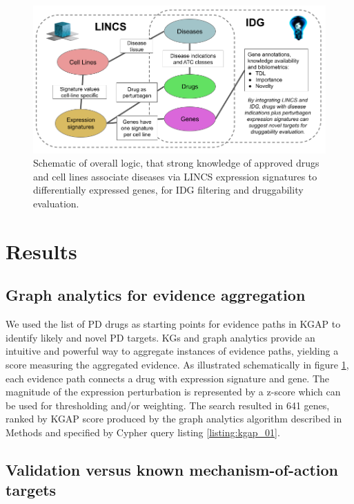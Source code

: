 \begin{figure}
	\includegraphics[width=\textwidth]{figures/kgap/KGAP_LINCS-IDG Schematic.png}
	\caption{Schematic of overall logic, that strong knowledge of approved drugs and cell lines associate diseases via LINCS expression signatures to differentially expressed genes, for IDG filtering and druggability evaluation.}
	\label{fig:KGAP_LINCS-IDG_Schematic}
\end{figure}

\section {Results}

\subsection{Graph analytics for evidence aggregation}

We used the list of PD drugs as starting points for evidence paths in KGAP to identify likely and novel PD targets. KGs and graph analytics provide an intuitive and powerful way to aggregate instances of evidence paths, yielding a score measuring the aggregated evidence. As illustrated schematically in figure \ref{fig:KGAP_LINCS-IDG_Schematic}, each evidence path connects a drug with expression signature and gene. The magnitude of the expression perturbation is represented by a z-score which can be used for thresholding and/or weighting. The search resulted in 641 genes, ranked by KGAP score produced by the graph analytics algorithm described in Methods and specified by Cypher query listing \ref{listing:kgap_01}.

\subsection{Validation versus known mechanism-of-action targets}

